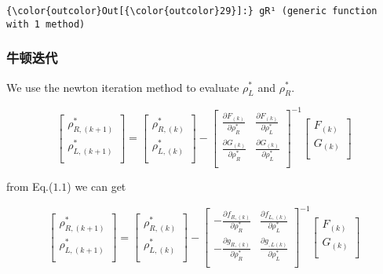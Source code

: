 \documentclass[11pt]{article}
\begin{document}
\begin{Verbatim}[commandchars=\\\{\}]
{\color{outcolor}Out[{\color{outcolor}29}]:} gR¹ (generic function with 1 method)
\end{Verbatim}
            
    \subsubsection{牛顿迭代}\label{ux725bux987fux8fedux4ee3}

We use the newton iteration method to evaluate \(\rho^*_L\) and
\(\rho^*_R\).

\begin{equation}
\left[ \begin{array}{l}
 \rho _{R,(k+1)}^*\\
\rho_{L,(k+1)}^*\\
\end{array}
\right] = 
\left[ \begin{array}{l}
 \rho _{R,(k)}^*\\
\rho_{L,(k)}^*\\
\end{array}
\right]-
\left[ \begin{array}{ll}
\frac{\partial F_{(k)}}{\partial \rho_R^*} & \frac{\partial F_{(k)}}{\partial \rho_L^*}\\
\frac{\partial G_{(k)}}{\partial \rho_R^*} & \frac{\partial G_{(k)}}{\partial \rho_L^*}\\
\end{array}
\right]^{-1}
\left[ \begin{array}{l}
F_{(k)}\\
G_{(k)}\\
\end{array}
\right]
\end{equation}

    from Eq.(\(1.1\)) we can get

\begin{equation}
\left[ \begin{array}{l}
 \rho _{R,(k+1)}^*\\
\rho_{L,(k+1)}^*\\
\end{array}
\right] = 
\left[ \begin{array}{l}
 \rho _{R,(k)}^*\\
\rho_{L,(k)}^*\\
\end{array}
\right]-
\left[ \begin{array}{ll}
-\frac{\partial f_{R,(k)}}{\partial \rho_R^*} & \frac{\partial f_{L,(k)}}{\partial \rho_L^*}\\
-\frac{\partial g_{R,(k)}}{\partial \rho_R^*} & \frac{\partial g_{,L(k)}}{\partial \rho_L^*}\\
\end{array}
\right]^{-1}
\left[ \begin{array}{l}
F_{(k)}\\
G_{(k)}\\
\end{array}
\right]
\end{equation}
\end{document}
